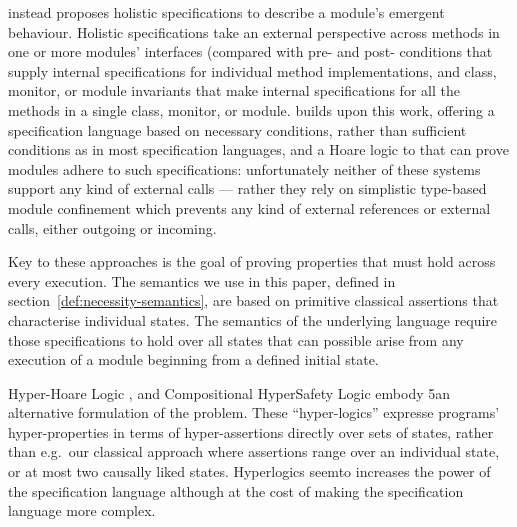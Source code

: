 




\citet{FASE} instead proposes holistic specifications to describe a
module's emergent behaviour. Holistic specifications take an external
perspective across methods in one or more modules' interfaces
(compared with pre- and post- conditions that supply internal
specifications for individual method implementations, and class,
monitor, or module invariants that make internal specifications for all
the methods in a single class, monitor, or module.
\citet{OOPSLA22} builds upon this work, offering a specification
language based on necessary conditions, rather than sufficient
conditions as in most specification languages, and a Hoare logic to 
that can prove modules  adhere to such specifications: unfortunately
neither of these systems support any kind of external calls --- rather
they rely on simplistic type-based module confinement
\cite{ownership-confinement-jacm2004,confined-toplas2007} which
prevents any kind of external references or external calls, either
outgoing or incoming.

Key to these approaches is the goal of proving properties that must
hold across every execution. The semantics we use in this paper,
defined in section~\ref{def:necessity-semantics}, are based on
primitive classical assertions that characterise individual states.
The semantics of the underlying language require those
specifications to hold over all states that can possible arise from
any execution of a module beginning from a defined initial state.


Hyper-Hoare Logic \cite{hyper-hoare-pldi2024}, and Compositional
HyperSafety Logic \cite{compositional-hypersafety-oopsla2022} embody
5an alternative formulation of the problem. These ``hyper-logics''
expresse programs' hyper-properties in terms of hyper-assertions
directly over sets of states, rather than e.g.\ our classical approach
where assertions range over an individual state, or at most two
causally liked states.  Hyperlogics seemto increases the power of the specification
language although at the cost of making the specification language
more complex.

